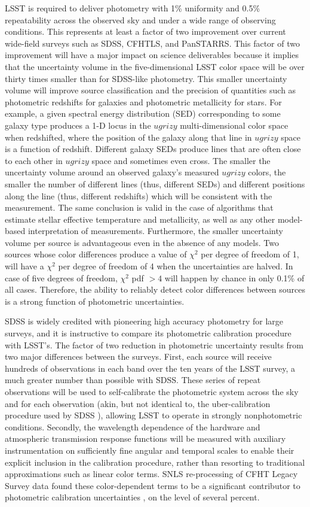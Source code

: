 \documentclass[12pt,preprint]{aastex}
\begin{document}
LSST is required to deliver photometry with 1\% uniformity and
0.5\% repeatability across the observed
sky and under a wide range of observing conditions. This represents at least a
factor of two improvement over current wide-field surveys such as
SDSS, CFHTLS, and PanSTARRS. This factor of two improvement will have a major impact on
science deliverables because it implies that the uncertainty volume in the
five-dimensional LSST color space will be over thirty times smaller
than for SDSS-like photometry. This smaller uncertainty volume will improve
source classification and the precision of quantities such as
photometric redshifts for galaxies and photometric metallicity for
stars.  For example, a given spectral energy distribution (SED)
corresponding to some galaxy type produces a 1-D locus in the $ugrizy$
multi-dimensional color space when redshifted, where the position of
the galaxy along that line in $ugrizy$ space is a function of
redshift. Different galaxy SEDs produce lines that are often close to
each other in $ugrizy$ space and sometimes even cross. The smaller the
uncertainty volume around an observed galaxy's measured $ugrizy$ colors, the
smaller the number of different lines (thus, different SEDs) and
different positions along the line (thus, different redshifts) which
will be consistent with the measurement. The same conclusion is valid
in the case of algorithms that estimate stellar effective temperature
and metallicity, as well as any other model-based interpretation of
measurements. Furthermore, the smaller uncertainty volume per source is
advantageous even in the absence of any models. Two sources whose
color differences produce a value of $\chi^2$ per degree of freedom of
1, will have a $\chi^2$ per degree of freedom of 4 when the uncertainties are
halved. In case of five degrees of freedom, $\chi^2$ pdf $>4$ will
happen by chance in only 0.1\% of all cases. Therefore, the ability to
reliably detect color differences between sources is a strong function
of photometric uncertainties.

SDSS is widely credited with pioneering high accuracy photometry for large
surveys, and it is instructive to compare its photometric calibration procedure with LSST's.
The factor of two reduction in photometric uncertainty results from two major differences
between the surveys. First, each source will receive hundreds of
observations in each band over the ten years of the LSST survey, a much greater number
than possible with SDSS. These series of
repeat observations will be used to self-calibrate the photometric
system across the sky and for each observation (akin, but not
identical to, the uber-calibration procedure used by SDSS
\citep{Padmanabhan2008}), allowing LSST to operate in strongly nonphotometric
conditions. Secondly, the wavelength dependence of the hardware and
atmospheric transmission response functions will be measured with
auxiliary instrumentation on sufficiently fine angular and temporal
scales to enable their explicit inclusion in the calibration
procedure, rather than resorting to traditional approximations such as
linear color terms. SNLS re-processing of CFHT Legacy Survey data
found these color-dependent terms to be a significant contributor to
photometric calibration uncertainties \citep{Regnault2009}, on
the level of several percent.
\end{document}
